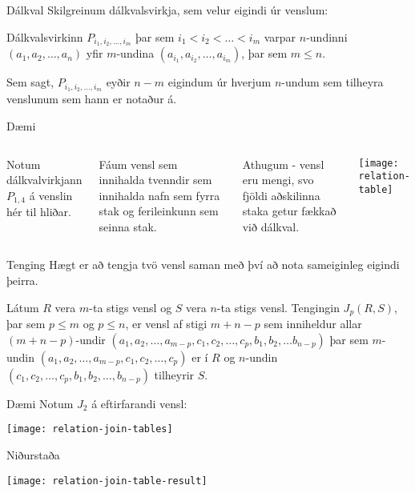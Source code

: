 \documentclass{beamer}
\begin{document}
\begin{frame}{Dálkval}
Skilgreinum dálkvalsvirkja, sem velur eigindi úr venslum:

\begin{tcolorbox}[title=Dálkval]
Dálkvalsvirkinn $P_{i_1, i_2, \ldots, i_m}$ þar sem $i_1 < i_2 < \ldots < i_m$ varpar $n$-undinni $(a_1, a_2, \ldots, a_n)$ yfir $m$-undina $(a_{i_1}, a_{i_2}, \ldots, a_{i_m})$, þar sem $m \leq n$.
\end{tcolorbox}
Sem sagt, $P_{i_1, i_2, \ldots, i_m}$ eyðir $n-m$ eigindum úr hverjum $n$-undum sem tilheyra venslunum sem hann er notaður á.
\end{frame}

\begin{frame}{Dæmi}
\begin{columns}
Notum dálkvalvirkjann $P_{1,4}$ á venslin hér til hliðar.

\vspace{0.5cm}
Fáum vensl sem innihalda tvenndir sem innihalda nafn sem fyrra stak og ferileinkunn sem seinna stak.

\vspace{0.5cm}
Athugum - vensl eru mengi, svo fjöldi aðskilinna staka getur fækkað við dálkval.
\begin{center}
\texttt{[image: relation-table]}
\end{center}
\end{columns}
\end{frame}

\begin{frame}{Tenging}
Hægt er að tengja tvö vensl saman með því að nota sameiginleg eigindi þeirra.

\begin{tcolorbox}[title=Tenging]
Látum $R$ vera $m$-ta stigs vensl og $S$ vera $n$-ta stigs vensl. Tengingin $J_p(R,S)$, þar sem $p\leq m$ og $p \leq n$, er vensl af stigi $m+n-p$ sem inniheldur allar $(m+n-p)$-undir $(a_1, a_2, \ldots, a_{m-p}, c_1, c_2, \ldots, c_p, b_1, b_2, \ldots b_{n-p})$ þar sem $m$-undin $(a_1 , a_2 , \ldots , a_{m-p} , c_1 , c_2 , \ldots , c_p )$ er í $R$ og $n$-undin $(c_1 , c_2 , \ldots , c_p , b_1 , b_2 , \ldots , b_{n-p} )$ tilheyrir $S$.
\end{tcolorbox}

\end{frame}

\begin{frame}{Dæmi}
Notum $J_2$ á eftirfarandi vensl:
\begin{center}
\texttt{[image: relation-join-tables]}
\end{center}
\end{frame}
\begin{frame}{Niðurstaða}
\begin{center}
\texttt{[image: relation-join-table-result]}
\end{center}
\end{frame}
\end{document}
